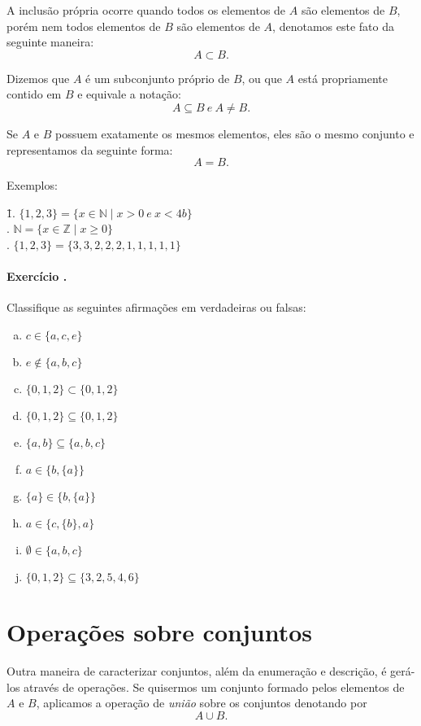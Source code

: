 \documentclass[twoside,a4wide,12pt]{book}
\newcounter{exc}\setcounter{exc}{0}
\def\exercise{\bigskip
\addtocounter{exc}{1}\paragraph{Exercício \arabic{exc}.}}
\renewcommand\marginpar[1]{\-\oldmarginpar[\raggedleft\footnotesize
  #1]%
  {\raggedright\scriptsize #1}}
\begin{document}
A inclusão própria ocorre quando todos os elementos de $A$ são
elementos de $B$, porém nem todos elementos de $B$ são elementos de
$A$, denotamos este fato da seguinte maneira:
$$A \subset B.$$

Dizemos que $A$ é um subconjunto próprio de $B$, ou que $A$ está
propriamente contido em $B$ e equivale a notação: $$A\subseteq B\ e\
A\neq B.$$

Se $A$ e $B$ possuem exatamente os mesmos elementos, eles são o mesmo
conjunto e representamos da seguinte forma:
$$A=B.$$

\noindent Exemplos:

\begin{tabbing}
\hspace{1cm}\=1. $\{1,2,3\}=\{x\in\mathbb{N}\mid x>0\ e\ x<4b\}$\\
\>2. $\mathbb{N}=\{x\in\mathbb{Z}\mid x\geq 0\}$\\
. $\{1,2,3\} = \{3,3,2,2,2,1,1,1,1,1\}$\\
\end{tabbing}

\exercise{} Classifique as seguintes afirmações em verdadeiras ou
falsas:

\begin{enumerate}[(a)( )]
\item $c\in\{a,c,e\}$
\item $e\notin\{a,b,c\}$
\item $\{0,1,2\}\subset\{0,1,2\}$
\item $\{0,1,2\}\subseteq\{0,1,2\}$
\item $\{a,b\}\subseteq\{a,b,c\}$
\item $a\in\{b,\{a\}\}$
\item $\{a\}\in\{b,\{a\}\}$
\item ${a}\in\{c,\{b\},a\}$
\item $\emptyset\in\{a,b,c\}$
\item $\{0,1,2\}\subseteq\{3,2,5,4,6\}$
\end{enumerate}

\section{Operações sobre conjuntos}
Outra maneira de caracterizar conjuntos, além da enumeração e
descrição, é gerá-los através de operações. Se quisermos um conjunto
formado pelos elementos de $A$ e $B$, aplicamos a operação de {\it
  união}\marginpar{união} sobre os conjuntos denotando por $$A \cup B.$$
\end{document}
